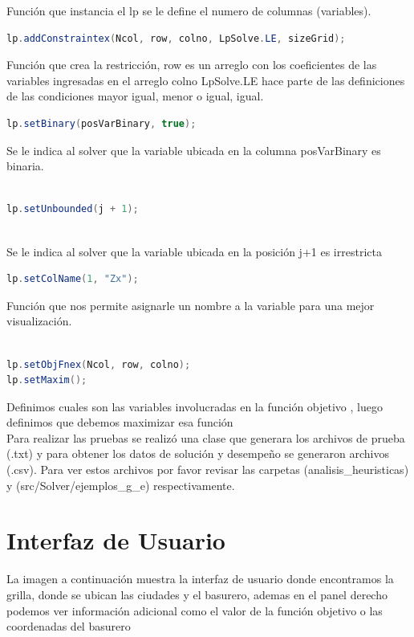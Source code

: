 \documentclass[10pt]{article}
\begin{document}
Funci\'on que instancia el lp se le define el numero de columnas (variables). 


\begin{lstlisting}[language=Java]
lp.addConstraintex(Ncol, row, colno, LpSolve.LE, sizeGrid);
\end{lstlisting}
Funci\'on que crea la restricci\'on, row es un arreglo con los coeficientes de las variables ingresadas en el arreglo colno   LpSolve.LE hace parte de las definiciones de las condiciones mayor igual, menor o igual, igual.

\begin{lstlisting}[language=Java]
lp.setBinary(posVarBinary, true);
\end{lstlisting}
Se le indica al solver que la variable ubicada en la columna posVarBinary es binaria.

\begin{lstlisting}[language=Java]

lp.setUnbounded(j + 1);
  
\end{lstlisting}

Se le indica al solver que la variable ubicada en la posici\'on j+1 es irrestricta

\begin{lstlisting}[language=Java]
lp.setColName(1, "Zx");
\end{lstlisting}
Funci\'on que nos permite asignarle un nombre a la variable para una mejor visualizaci\'on.


\begin{lstlisting}[language=Java]

lp.setObjFnex(Ncol, row, colno);
lp.setMaxim();	

\end{lstlisting}
Definimos cuales son las variables involucradas en la funci\'on objetivo , luego  definimos que debemos maximizar esa funci\'on\\

Para realizar las pruebas se realizó una clase que generara los archivos de prueba (.txt) y para obtener los datos de solución y desempeño se generaron archivos (.csv). Para ver estos
archivos por favor revisar las carpetas (analisis\_heuristicas) y (src/Solver/ejemplos\_g\_e) respectivamente.

\section{Interfaz de Usuario}
La imagen a continuaci\'on muestra la interfaz de usuario donde encontramos la grilla, donde se ubican las ciudades y el basurero, ademas en el panel derecho podemos ver informaci\'on adicional como el valor de la funci\'on objetivo o las coordenadas del basurero
\end{document}
